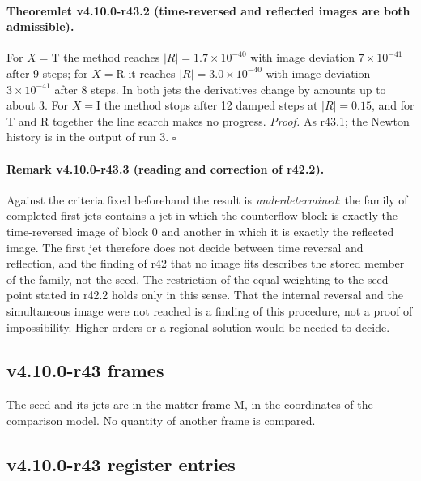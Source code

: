 \paragraph{Theoremlet v4.10.0-r43.2 (time-reversed and reflected images are both admissible).}
For \(X=\mathrm T\) the method reaches \(|R|=1.7\times10^{-40}\) with image deviation \(7\times10^{-41}\) after 9 steps; for \(X=\mathrm R\) it reaches \(|R|=3.0\times10^{-40}\) with
image deviation \(3\times10^{-41}\) after 8 steps.  In both jets the derivatives change by amounts up to about 3.  For \(X=\mathrm I\) the method stops after
12 damped steps at \(|R|=0.15\), and for T and R together the line search makes no progress.
\emph{Proof.} As r43.1; the Newton history is in the output of run 3.  \(\square\)

\paragraph{Remark v4.10.0-r43.3 (reading and correction of r42.2).}
Against the criteria fixed beforehand the result is \emph{underdetermined}: the family of completed first jets contains a jet in which the
counterflow block is exactly the time-reversed image of block 0 and another in which it is exactly the reflected image.  The first jet therefore
does not decide between time reversal and reflection, and the finding of r42 that no image fits describes the stored member of the family,
not the seed.  The restriction of the equal weighting to the seed point stated in r42.2 holds only in this sense.  That the internal reversal
and the simultaneous image were not reached is a finding of this procedure, not a proof of impossibility.  Higher orders or a regional
solution would be needed to decide.

\subsection*{v4.10.0-r43 frames}
\label{subsec:v4100-r43-frames}

The seed and its jets are in the matter frame M, in the coordinates of the comparison model.  No quantity of another frame is compared.

\subsection*{v4.10.0-r43 register entries}
\label{subsec:v4100-r43-register}

